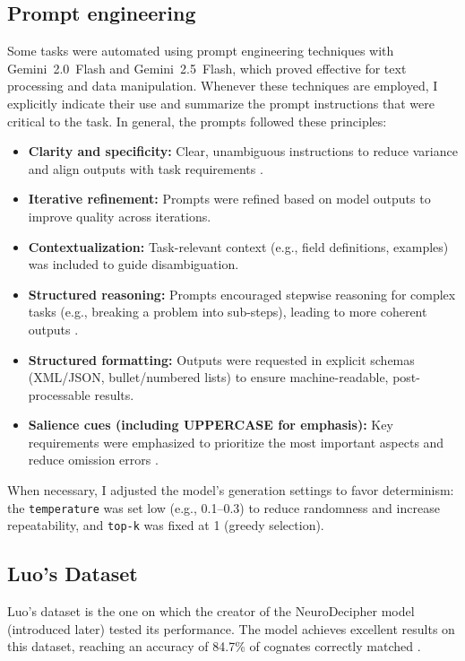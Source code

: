 \subsection{Prompt engineering}
Some tasks were automated using prompt engineering techniques with Gemini~2.0~Flash and Gemini~2.5~Flash, which proved effective for text processing and data manipulation. Whenever these techniques are employed, I explicitly indicate their use and summarize the prompt instructions that were critical to the task.
In general, the prompts followed these principles:

\begin{itemize}
\item \textbf{Clarity and specificity:} Clear, unambiguous instructions to reduce variance and align outputs with task requirements \cite{prompting-programming}.

\item \textbf{Iterative refinement:} Prompts were refined based on model outputs to improve quality across iterations.

\item \textbf{Contextualization:} Task-relevant context (e.g., field definitions, examples) was included to guide disambiguation.

\item \textbf{Structured reasoning:} Prompts encouraged stepwise reasoning for complex tasks (e.g., breaking a problem into sub-steps), leading to more coherent outputs \cite{cot}.

\item \textbf{Structured formatting:} Outputs were requested in explicit schemas (XML/JSON, bullet/numbered lists) to ensure machine-readable, post-processable results.

\item \textbf{Salience cues (including UPPERCASE for emphasis):} Key requirements were emphasized to prioritize the most important aspects and reduce omission errors \cite{uppercase-is-all-you-need}.
\end{itemize}

When necessary, I adjusted the model’s generation settings to favor determinism: the \texttt{temperature} was set low (e.g., 0.1--0.3) to reduce randomness and increase repeatability, and \texttt{top-k} was fixed at 1 (greedy selection).

\subsection{Luo's Dataset}
Luo's dataset is the one on which the creator of the NeuroDecipher model (introduced later) tested its performance.
The model achieves excellent results on this dataset, reaching an accuracy of 84.7\% of cognates correctly matched \cite{luo}.

